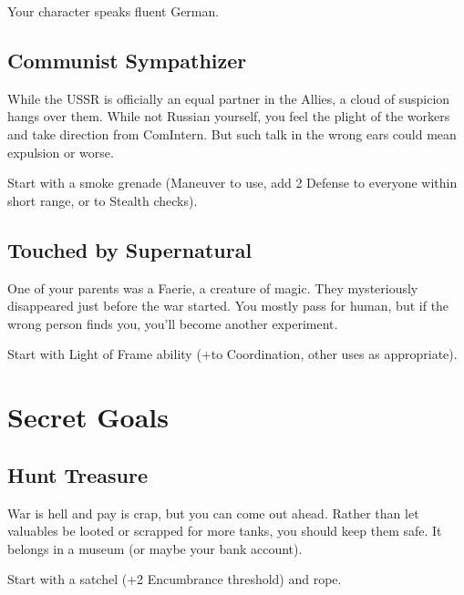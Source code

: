 \documentclass{book}
\newcommand{\bbb}{\BoostDie }
\begin{document}
\begin{multicols}{2}
Your character speaks fluent German.

\subsection{Communist Sympathizer}

While the USSR is officially an equal partner in the Allies, a cloud of suspicion hangs over them.  While not Russian yourself, you feel the plight of the workers and take direction from ComIntern.  But such talk in the wrong ears could mean expulsion or worse.

Start with a smoke grenade (Maneuver to use, add 2 Defense to everyone within short range, or \bbb\bbb to Stealth checks).

%
%

\subsection{Touched by Supernatural}

One of your parents was a Faerie, a creature of magic.  They mysteriously disappeared just before the war started.  You mostly pass for human, but if the wrong person finds you, you'll become another experiment.

Start with Light of Frame ability (+\bbb to Coordination, other uses as appropriate).

\section{Secret Goals}

\subsection{Hunt Treasure}

War is hell and pay is crap, but you can come out ahead.  Rather than let valuables be looted or scrapped for more tanks, you should keep them safe.  It belongs in a museum (or maybe your bank account).

Start with a satchel (+2 Encumbrance threshold) and rope.


\end{multicols}
\end{document}

